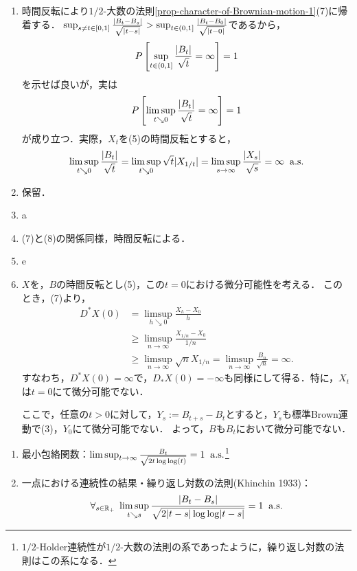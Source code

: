 \documentclass[uplatex,dvipdfmx]{jsreport}
\begin{document}
\begin{Proof}\mbox{}
    \begin{enumerate}
        \item 時間反転により$1/2$-大数の法則\ref{prop-character-of-Brownian-motion-1}(7)に帰着する．
        $\sup_{s\ne t\in[0,1]}\frac{\lvert B_t-B_s\rvert}{\sqrt{\lvert t-s\rvert}}>\sup_{t\in(0,1]}\frac{\lvert B_t-B_0\rvert}{\sqrt{\lvert t-0\rvert}}$であるから，
        \[P\left[\sup_{t\in(0,1]}\frac{\lvert B_t\rvert}{\sqrt{t}}=\infty\right]=1\]
        を示せば良いが，実は
        \[P\left[\limsup_{t\searrow0}\frac{\lvert B_t\rvert}{\sqrt{t}}=\infty\right]=1\]
        が成り立つ．実際，$X_t$を(5)の時間反転とすると，
        \[\limsup_{t\searrow0}\frac{\lvert B_t\rvert}{\sqrt{t}}=\limsup_{t\searrow0}\sqrt{t}\lvert X_{1/t}\rvert=\limsup_{s\to\infty}\frac{\lvert X_s\rvert}{\sqrt{s}}=\infty\;\;\mathrm{a.s.}\]
        \item 保留．
        \item a
        \item (7)と(8)の関係同様，時間反転による．
        \item e
        \item $X$を，$B$の時間反転とし(5)，この$t=0$における微分可能性を考える．
        このとき，(7)より，
        \begin{align*}
            D^*X(0)&=\limsup_{h\searrow0}\frac{X_h-X_0}{h}\\
            &\ge\limsup_{n\to\infty}\frac{X_{1/n}-X_0}{1/n}\\
            &\ge\limsup_{n\to\infty}\sqrt{n}X_{1/n}=\limsup_{n\to\infty}\frac{B_n}{\sqrt{n}}=\infty.
        \end{align*}
        すなわち，$D^*X(0)=\infty$で，$D_*X(0)=-\infty$も同様にして得る．特に，$X_t$は$t=0$にて微分可能でない．
        
        ここで，任意の$t>0$に対して，$Y_s:=B_{t+s}-B_t$とすると，$Y_s$も標準Brown運動で(3)，$Y_0$にて微分可能でない．
        よって，$B$も$B_t$において微分可能でない．
    \end{enumerate}
\end{Proof}

\begin{proposition}\mbox{}
    \begin{enumerate}
        \item 最小包絡関数：$\limsup_{t\to\infty}\frac{B_t}{\sqrt{2t\log\log(t)}}=1\;\;\mathrm{a.s.}$\footnote{$1/2$-Holder連続性が$1/2$-大数の法則の系であったように，繰り返し対数の法則はこの系になる．}
        \item 一点における連続性の結果・繰り返し対数の法則(Khinchin 1933)：\[\forall_{s\in\mathbb{R}_+}\;\limsup_{t\searrow s}\frac{\lvert B_t-B_s\rvert}{\sqrt{2\lvert t-s\rvert\log\log\lvert t-s\rvert}}=1\;\;\mathrm{a.s.}\]
    \end{enumerate}
\end{proposition}
\end{document}
